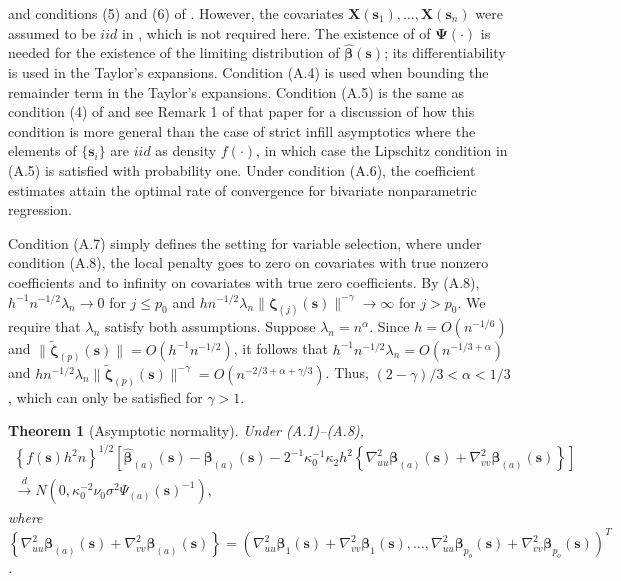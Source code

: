 \documentclass[authoryear,review, 12pt]{elsarticle}
\newtheorem{thm}{Theorem}
\begin{document}
and conditions (5) and (6) of \citet{Cai-Fan-Li-2000}. However, the
covariates $\bm{X}(\bm{s}_{1}),\dots,\bm{X}(\bm{s}_{n})$ were assumed
to be $iid$ in \citet{Sun-Yan-Zhang-Lu-2014}, which is not required
here. The existence of of $\bm{\Psi}(\cdot)$ is needed for the existence
of the limiting distribution of $\hat{\bm{\beta}}(\bm{s})$; its differentiability
is used in the Taylor's expansions. Condition (A.4) is used when bounding
the remainder term in the Taylor's expansions. Condition (A.5) is
the same as condition (4) of \citet{Sun-Yan-Zhang-Lu-2014} and see
Remark 1 of that paper for a discussion of how this condition is more
general than the case of strict infill asymptotics where the elements
of $\{\bm{s}_{i}\}$ are $iid$ as density $f(\cdot)$, in which case
the Lipschitz condition in (A.5) is satisfied with probability one.
Under condition (A.6), the coefficient estimates attain the optimal
rate of convergence for bivariate nonparametric regression.

Condition (A.7) simply defines the setting for variable selection,
where under condition (A.8), the local penalty goes to zero on covariates
with true nonzero coefficients and to infinity on covariates with
true zero coefficients. By (A.8), $h^{-1}n^{-1/2}\lambda_{n}\to0$
for $j\le p_{0}$ and $hn^{-1/2}\lambda_{n}\|\bm{\zeta}_{(j)}(\bm{s})\|^{-\gamma}\to\infty$
for $j>p_{0}$. We require that $\lambda_{n}$ satisfy both assumptions.
Suppose $\lambda_{n}=n^{\alpha}$. Since $h=O\left(n^{-1/6}\right)$
and $\|\tilde{\bm{\zeta}}_{(p)}(\bm{s})\|=O\left(h^{-1}n^{-1/2}\right)$,
it follows that $h^{-1}n^{-1/2}\lambda_{n}=O\left(n^{-1/3+\alpha}\right)$
and $hn^{-1/2}\lambda_{n}\|\tilde{\bm{\zeta}}_{(p)}(\bm{s})\|^{-\gamma}=O\left(n^{-2/3+\alpha+\gamma/3}\right)$.
Thus, $\left(2-\gamma\right)/3<\alpha<1/3$, which can only be satisfied
for $\gamma>1$.
\begin{thm}[Asymptotic normality]
\label{theorem:normality}  Under (A.1)--(A.8),
\begin{gather*}
\left\{ f(\bm{s})h^{2}n\right\} ^{1/2}\left[\hat{\bm{\beta}}_{(a)}(\bm{s})-\bm{\beta}_{(a)}(\bm{s})-2^{-1}\kappa_{0}^{-1}\kappa_{2}h^{2}\left\{ \nabla_{uu}^{2}\bm{\beta}_{(a)}(\bm{s})+\nabla_{vv}^{2}\bm{\beta}_{(a)}(\bm{s})\right\} \right]\\
\xrightarrow{d}N\left(0,\kappa_{0}^{-2}\nu_{0}\sigma^{2}\Psi_{(a)}(\bm{s})^{-1}\right),
\end{gather*}
where $\left\{ \nabla_{uu}^{2}\bm{\beta}_{(a)}(\bm{s})+\nabla_{vv}^{2}\bm{\beta}_{(a)}(\bm{s})\right\} =\left(\nabla_{uu}^{2}\bm{\beta}_{1}(\bm{s})+\nabla_{vv}^{2}\bm{\beta}_{1}(\bm{s}),\dots,\nabla_{uu}^{2}\bm{\beta}_{p_{o}}(\bm{s})+\nabla_{vv}^{2}\bm{\beta}_{p_{o}}(\bm{s})\right)^{T}$.
\end{thm}
\end{document}

